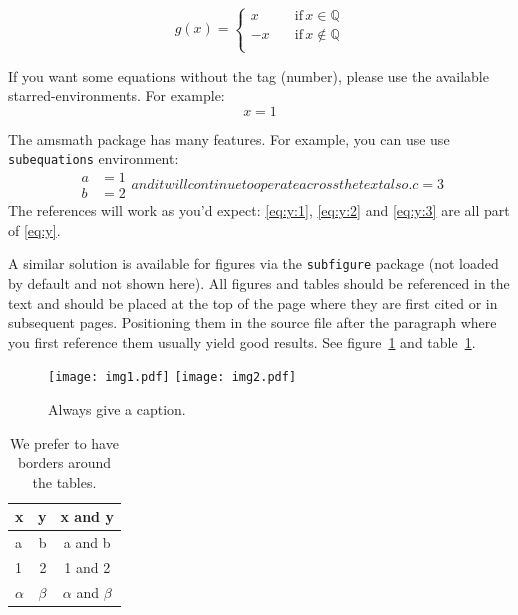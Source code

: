 \documentclass[letterpaper,12pt]{article}
\begin{document}
\begin{equation*}
g(x)=\begin{cases}
          x \quad &\text{if} \, x \in \mathbb{Q} \\
          -x \quad &\text{if} \, x \notin \mathbb{Q} \\
     \end{cases}
\end{equation*}

If you want some equations without the tag (number), please use the available
starred-environments. For example:
\begin{equation*}
x = 1
\end{equation*}

The amsmath package has many features. For example, you can use use
\texttt{subequations} environment:
\begin{subequations}\label{eq:y}
\begin{align}
\label{eq:y:1}
a & = 1
\\
\label{eq:y:2}
b & = 2
\end{align}
and it will continue to operate across the text also.
\begin{equation}
\label{eq:y:3}
c = 3
\end{equation}
\end{subequations}
The references will work as you'd expect: \eqref{eq:y:1},
\eqref{eq:y:2} and \eqref{eq:y:3} are all part of \eqref{eq:y}.

A similar solution is available for figures via the \texttt{subfigure}
package (not loaded by default and not shown here).
All figures and tables should be referenced in the text and should be
placed at the top of the page where they are first cited or in
subsequent pages. Positioning them in the source file
after the paragraph where you first reference them usually yield good
results. See figure~\ref{fig:i} and table~\ref{tab:i}.

\begin{figure}[tbp]
\centering %
\texttt{[image: img1.pdf]}
\hfill
\texttt{[image: img2.pdf]}
\caption{\label{fig:i} Always give a caption.}
\end{figure}

\begin{table}[tbp]
\centering
\begin{tabular}{|lr|c|}
\hline
x&y&x and y\\
\hline
a & b & a and b\\
1 & 2 & 1 and 2\\
$\alpha$ & $\beta$ & $\alpha$ and $\beta$\\
\hline
\end{tabular}
\caption{\label{tab:i} We prefer to have borders around the tables.}
\end{table}
\end{document}
